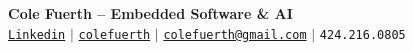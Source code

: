 \begin{center}
    \textbf{\Huge Cole Fuerth -- Embedded Software \& AI} \\ \vspace{5pt}
    \hspace{1pt} \faLinkedin \hspace{2pt} \href{https://www.linkedin.com/in/cole-fuerth-48344520a/}{\texttt{Linkedin}} \hspace{1pt} $|$
    \hspace{1pt} \faGithub \hspace{2pt} \href{https://github.com/colefuerth}{\texttt{colefuerth}} \hspace{1pt} $|$
    \hspace{1pt} \faEnvelope \hspace{2pt} \href{mailto::colefuerth@gmail.com}{\texttt{colefuerth@gmail.com}} \hspace{1pt} $|$
    \small \faPhone* \texttt{424.216.0805}
    \\ \vspace{-3pt}
  \end{center}